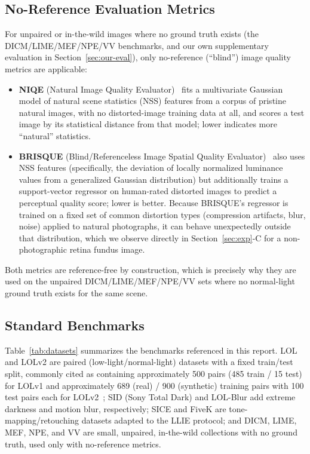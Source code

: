\documentclass[conference]{IEEEtran}
\begin{document}
\subsection{No-Reference Evaluation Metrics}
For unpaired or in-the-wild images where no ground truth exists (the
DICM/LIME/MEF/NPE/VV benchmarks, and our own supplementary evaluation in
Section~\ref{sec:our-eval}), only no-reference (``blind'') image quality
metrics are applicable:
\begin{itemize}
\item \textbf{NIQE} (Natural Image Quality Evaluator)~\cite{mittal2013niqe}
fits a multivariate Gaussian model of natural scene statistics (NSS) features
from a corpus of pristine natural images, with no distorted-image training
data at all, and scores a test image by its statistical distance from that
model; lower indicates more ``natural'' statistics.
\item \textbf{BRISQUE} (Blind/Referenceless Image Spatial Quality
Evaluator)~\cite{mittal2012brisque} also uses NSS features (specifically,
the deviation of locally normalized luminance values from a generalized
Gaussian distribution) but additionally trains a support-vector regressor on
human-rated distorted images to predict a perceptual quality score; lower is
better. Because BRISQUE's regressor is trained on a fixed set of common
distortion types (compression artifacts, blur, noise) applied to natural
photographs, it can behave unexpectedly outside that distribution, which we
observe directly in Section~\ref{sec:exp}-C for a non-photographic retina
fundus image.
\end{itemize}
Both metrics are reference-free by construction, which is precisely why they
are used on the unpaired DICM/LIME/MEF/NPE/VV sets where no normal-light
ground truth exists for the same scene.

\subsection{Standard Benchmarks}
Table~\ref{tab:datasets} summarizes the benchmarks referenced in this report.
LOL and LOLv2 are paired (low-light/normal-light) datasets with a fixed
train/test split, commonly cited as containing approximately 500 pairs (485
train / 15 test) for LOLv1 and approximately 689 (real) / 900 (synthetic)
training pairs with 100 test pairs each for LOLv2~\cite{wei2018retinexnet};
SID (Sony Total Dark) and LOL-Blur add extreme darkness and motion blur,
respectively; SICE and FiveK are tone-mapping/retouching datasets adapted to
the LLIE protocol; and DICM, LIME, MEF, NPE, and VV are small, unpaired,
in-the-wild collections with no ground truth, used only with no-reference
metrics.
\end{document}
